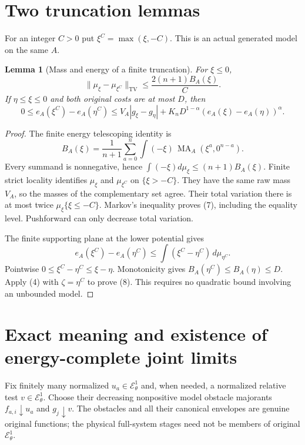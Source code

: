 \documentclass[11pt]{article}
\newtheorem{lemma}[theorem]{Lemma}
\newcommand{\MA}{\operatorname{MA}}
\newcommand{\EE}{\mathcal E^1_\theta}
\begin{document}
\section{Two truncation lemmas}
For an integer $C>0$ put $\xi^C=\max(\xi,-C)$.
This is an actual generated model on the same $A$.

\begin{lemma}[Mass and energy of a finite truncation]\label{cap}
For $\xi\leq0$,
\[
 \|\mu_\xi-\mu_{\xi^C}\|_{\mathrm{TV}}
       \leq\frac{2(n+1)B_A(\xi)}{C}.                    \tag{7}
\]
If $\eta\leq\xi\leq0$ and both original costs are at most $D$, then
\[
 0\leq e_A(\xi^C)-e_A(\eta^C)
 \leq V_A|g_\xi-g_\eta|
        +K_nD^{1-\alpha}(e_A(\xi)-e_A(\eta))^\alpha .
                                                        \tag{8}
\]
\end{lemma}
\begin{proof}
The finite energy telescoping identity is
\[
 B_A(\xi)=\frac1{n+1}\sum_{a=0}^n
       \int(-\xi)\,\MA_A(\xi^a,0^{n-a}).
\]
Every summand is nonnegative, hence
$\int(-\xi)d\mu_\xi\leq(n+1)B_A(\xi)$.
Finite strict locality identifies $\mu_\xi$ and $\mu_{\xi^C}$
on $\{\xi>-C\}$. They have the same raw mass $V_A$, so the
masses of the complementary set agree. Their total variation
there is at most twice $\mu_\xi\{\xi\leq-C\}$.
Markov's inequality proves (7), including the equality level.
Pushforward can only decrease total variation.

The finite supporting plane at the lower potential gives
\[
 e_A(\xi^C)-e_A(\eta^C)
 \leq\int(\xi^C-\eta^C)\,d\mu_{\eta^C}.
\]
Pointwise $0\leq\xi^C-\eta^C\leq\xi-\eta$.
Monotonicity gives $B_A(\eta^C)\leq B_A(\eta)\leq D$.
Apply (4) with $\zeta=\eta^C$ to prove (8).
This requires no quadratic bound involving an unbounded model.
\end{proof}

\section{Exact meaning and existence of energy-complete joint limits}
Fix finitely many normalized $u_a\in\EE$ and, when needed, a
normalized relative test $v\in\EE$.
Choose their decreasing nonpositive model obstacle majorants
$f_{a,i}\downarrow u_a$ and $g_j\downarrow v$.
The obstacles and all their canonical envelopes are genuine
original functions; the physical full-system stages need not be
members of original $\EE$.
\end{document}
